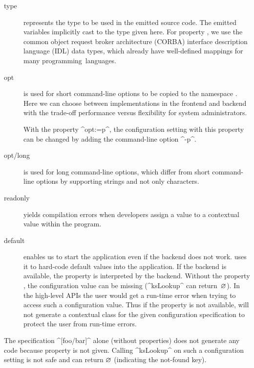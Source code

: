 \label{sec:property-opt}
\begin{description}
\item[type] represents the type to be used in the emitted source code.
The emitted variables implicitly cast to the type given here.
For property , we use the common object request broker architecture (CORBA) interface description language (IDL) data types, which already have well-defined mappings for many programming~languages.
\item[opt] is used for short command-line options to be copied to the namespace .
Here we can choose between implementations in the frontend and backend with the trade-off performance versus flexibility for system administrators.
\begin{example}
With the property ^opt:=p^, the configuration setting with this property can be changed by adding the command-line option ^-p^.
\end{example}
\item[opt/long] is used for long command-line options, which differ from short command-line options by supporting strings and not only characters.
\item[readonly] yields compilation errors when developers assign a value to a contextual value within the program.
\item[default] enables us to start the application even if the backend does not work.
 uses it to hard-code default values into the application.
If the backend is available, the property  is interpreted by the backend.
Without the property , the configuration value can be missing (^ksLookup^ can return~$\varnothing$).
In the high-level APIs the user would get a run-time error when trying to access such a configuration value.
Thus if the property  is not available,  will not generate a contextual class for the given configuration specification to protect the user from run-time errors.
\end{description}


\begin{example}
The specification ^[foo/bar]^ alone (without properties) does not generate any code because property  is not given.
Calling ^ksLookup^ on such a configuration setting is not safe and can return $\varnothing$ (indicating the not-found key).
\end{example}


